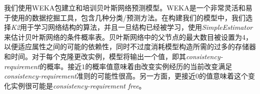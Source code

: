 {%



我们使用WEKA包建立和培训贝叶斯网络预测模型。WEKA是一个非常灵活和易于使用的数据挖掘工具，包含几种分类/预测方法。在构建我们的模型中，我们选择{\em K2}用于学习网络结构的算法，并且一旦结构已经被学习，使用{\em  SimpleEstimator}来估计贝叶斯网络的条件概率表。贝叶斯网络中的父节点的最大数目被设置为$ 4 $，以便适应属性之间的可能的依赖性，同时不过度消耗模型构造所需的过多的存储器和时间。对于每个克隆更改实例，模型将输出一个值，即其{\em consistency-requirement}的概率。接近$ 1 $的概率值意味着由改变实例经历的当前改变满足{\em consistency-requirement}准则的可能性很高。另一方面，更接近$ 0 $的值意味着这个变化实例很可能是{\em consistency-requirement free}。

}
